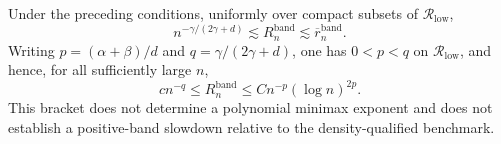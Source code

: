 Under the preceding conditions, uniformly over compact subsets of \(\mathcal R_{\mathrm{low}}\),
\[
n^{-\gamma/(2\gamma+d)}\lesssim R_n^{\mathrm{band}}
\lesssim \overline r_n^{\mathrm{band}}.
\]
Writing \(p=(\alpha+\beta)/d\) and \(q=\gamma/(2\gamma+d)\), one has \(0<p<q\) on \(\mathcal R_{\mathrm{low}}\), and hence, for all sufficiently large \(n\),
\[
c n^{-q}\leq R_n^{\mathrm{band}}
\leq C n^{-p}(\log n)^{2p}.
\]
This bracket does not determine a polynomial minimax exponent and does not establish a positive-band slowdown relative to the density-qualified benchmark.